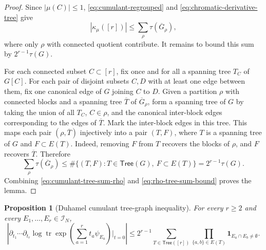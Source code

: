 \documentclass[11pt]{article}
\newtheorem{proposition}[theorem]{Proposition}
\newcommand{\tr}{\operatorname{tr}}
\newcommand{\calI}{\mathcal{I}}
\newcommand{\ind}{\mathbf{1}}
\begin{document}
\begin{proof}
  Since $|\mu(C)|\leq1$, \eqref{eq:cumulant-regrouped} and
  \eqref{eq:chromatic-derivative-tree} give
  \begin{equation}\label{eq:cumulant-tree-sum-rho}
    |\kappa_\mu([r])|
    \leq
    \sum_{\rho}\tau(\overline G_\rho),
  \end{equation}
  where only $\rho$ with connected quotient contribute.
  It remains to bound this sum by $2^{r-1}\tau(G)$.

  For each connected subset $C\subset[r]$, fix once and for all a spanning tree
  $T_C$ of $G[C]$.  For each pair of disjoint subsets $C,D$ with at least one
  edge between them, fix one canonical edge of $G$ joining $C$ to $D$.
  Given a partition $\rho$ with connected blocks and a spanning tree
  $\overline T$ of $\overline G_\rho$, form a spanning tree of $G$ by taking the
  union of all $T_C$, $C\in\rho$, and the canonical inter-block edges
  corresponding to the edges of $\overline T$.  Mark the inter-block edges in
  this tree.  This maps each pair $(\rho,\overline T)$ injectively into a pair
  $(T,F)$, where $T$ is a spanning tree of $G$ and $F\subset E(T)$.  Indeed,
  removing $F$ from $T$ recovers the blocks of $\rho$, and $F$ recovers
  $\overline T$.  Therefore
  \begin{equation}\label{eq:rho-tree-sum-bound}
    \sum_\rho \tau(\overline G_\rho)
    \leq
    \#\{(T,F):T\in\mathsf{Tree}(G),\ F\subset E(T)\}
    =
    2^{r-1}\tau(G).
  \end{equation}
  Combining \eqref{eq:cumulant-tree-sum-rho} and
  \eqref{eq:rho-tree-sum-bound} proves the lemma.
\end{proof}

\begin{proposition}[Duhamel cumulant tree-graph inequality]
  \label{prop:duhamel-tree-graph}
  For every $r\geq2$ and every $E_1,\ldots,E_r\in\calI_N$,
  \begin{equation}\label{eq:duhamel-tree-graph}
    \left|
      \partial_{t_1}\cdots\partial_{t_r}
      \log\tr\exp\left(\sum_{a=1}^r t_a\psi_{E_a}\right)\bigg|_{t=0}
    \right|
    \leq
    2^{r-1}
    \sum_{T\in\mathsf{Tree}([r])}
    \prod_{\{a,b\}\in E(T)}
    \ind_{E_a\cap E_b\neq\emptyset}.
  \end{equation}
\end{proposition}
\end{document}
